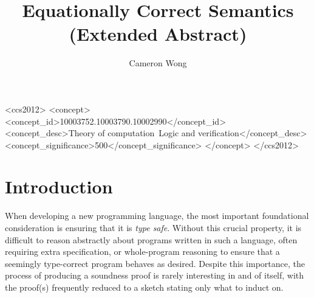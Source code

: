 \documentclass[manuscript,screen,review,sigplan]{acmart}
\begin{document}
\title{Equationally Correct Semantics (Extended Abstract)}

\author{Cameron Wong}

\renewcommand{\shortauthors}{Wong}

\newcommand{\N}{\mathbb{N}}

\begin{CCSXML}
<ccs2012>
<concept>
<concept_id>10003752.10003790.10002990</concept_id>
<concept_desc>Theory of computation~Logic and verification</concept_desc>
<concept_significance>500</concept_significance>
</concept>
</ccs2012>
\end{CCSXML}


\maketitle

\section{Introduction}

When developing a new programming language, the most important foundational
consideration is ensuring that it is \emph{type safe}. Without this crucial
property, it is difficult to reason abstractly about programs written in such
a language, often requiring extra specification, or whole-program reasoning to
ensure that a seemingly type-correct program behaves as desired. Despite this
importance, the process of producing a soundness proof is rarely interesting in
and of itself, with the proof(s) frequently reduced to a sketch stating only
what to induct on.
\end{document}
